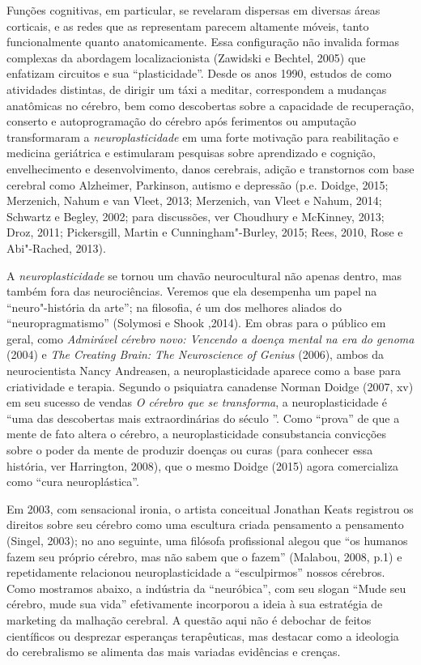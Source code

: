 Funções cognitivas, em particular, se revelaram dispersas em diversas
áreas corticais, e as redes que as representam parecem altamente móveis,
tanto funcionalmente quanto anatomicamente. Essa configuração não
invalida formas complexas da abordagem localizacionista (Zawidski e
Bechtel, 2005) que enfatizam circuitos e sua ``plasticidade''. Desde os
anos 1990, estudos de como atividades distintas, de dirigir um táxi a
meditar, correspondem a mudanças anatômicas no cérebro, bem como
descobertas sobre a capacidade de recuperação, conserto e
autoprogramação do cérebro após ferimentos ou amputação transformaram a
\emph{neuroplasticidade} em uma forte motivação para reabilitação e
medicina geriátrica e estimularam pesquisas sobre aprendizado e
cognição, envelhecimento e desenvolvimento, danos cerebrais, adição e
transtornos com base cerebral como Alzheimer, Parkinson, autismo e
depressão (p.e. Doidge, 2015; Merzenich, Nahum e van Vleet, 2013;
Merzenich, van Vleet e Nahum, 2014; Schwartz e Begley, 2002; para
discussões, ver Choudhury e McKinney, 2013; Droz, 2011; Pickersgill,
Martin e Cunningham"-Burley, 2015; Rees, 2010, Rose e Abi"-Rached, 2013).

A \emph{neuroplasticidade} se tornou um chavão neurocultural não apenas
dentro, mas também fora das neurociências. Veremos que ela desempenha um
papel na ``neuro"-história da arte''; na filosofia, é um dos melhores
aliados do ``neuropragmatismo'' (Solymosi e Shook ,2014). Em obras para
o público em geral, como \emph{Admirável cérebro novo: Vencendo a doença
mental na era do genoma} (2004) e \emph{The Creating Brain: The
Neuroscience of Genius} (2006), ambos da neurocientista Nancy Andreasen,
a neuroplasticidade aparece como a base para criatividade e terapia.
Segundo o psiquiatra canadense Norman Doidge (2007, xv) em seu sucesso
de vendas \emph{O cérebro que se transforma}, a neuroplasticidade é
``uma das descobertas mais extraordinárias do século ''. Como
``prova'' de que a mente de fato altera o cérebro, a neuroplasticidade
consubstancia convicções sobre o poder da mente de produzir doenças ou
curas (para conhecer essa história, ver Harrington, 2008), que o mesmo
Doidge (2015) agora comercializa como ``cura neuroplástica''.

Em 2003, com sensacional ironia, o artista conceitual Jonathan Keats
registrou os direitos sobre seu cérebro como uma escultura criada
pensamento a pensamento (Singel, 2003); no ano seguinte, uma filósofa
profissional alegou que ``os humanos fazem seu próprio cérebro, mas não
sabem que o fazem'' (Malabou, 2008, p.1) e repetidamente relacionou
neuroplasticidade a ``esculpirmos'' nossos cérebros. Como mostramos
abaixo, a indústria da ``neuróbica'', com seu slogan ``Mude seu cérebro,
mude sua vida'' efetivamente incorporou a ideia à sua estratégia de
marketing da malhação cerebral. A questão aqui não é debochar de feitos
científicos ou desprezar esperanças terapêuticas, mas destacar como a
ideologia do cerebralismo se alimenta das mais variadas evidências e
crenças.

